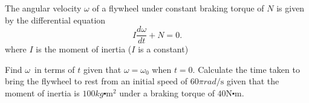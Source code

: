 \begin{Exercise}[title={Differential Equations},label=exDiffEqns]
\Question The angular velocity
$\omega $ of a flywheel under constant braking torque of $N$ is given by the differential equation
\begin{equation*}I \frac{d \omega }{d t} +N =0.
\end{equation*}where $I$ is the moment of inertia ($I$ is a constant) 
\begin{tasks}
	\task Find $\omega $\ in terms of $t$ given that $\omega  =\omega _{0}$ when $t =0$. 	
	\task Calculate the time taken to bring the flywheel to rest from an initial
	speed of $60 \pi  rad/\mbox{s}$ given that the moment of inertia is $100 kg \centerdot \mathrm{m}^{2}$ under a braking torque of $40 \mathrm{N} \centerdot \mbox{m}\text{.}$ \end{tasks}

\end{Exercise}
